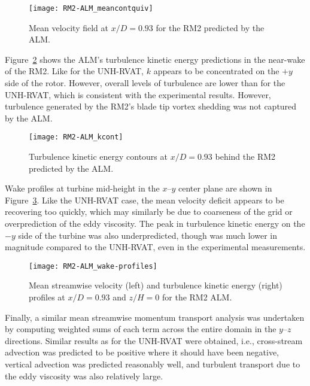 \begin{figure}
    \centering
    
    \texttt{[image: RM2-ALM\_meancontquiv]}
    
    \caption{Mean velocity field at $x/D=0.93$ for the RM2 predicted by the
        ALM.}
    
    \label{fig:RM2-ALM-meancontquiv}
\end{figure}

Figure~\ref{fig:RM2-ALM-kcont} shows the ALM's turbulence kinetic energy
predictions in the near-wake of the RM2. Like for the UNH-RVAT, $k$ appears to
be concentrated on the $+y$ side of the rotor. However, overall levels of
turbulence are lower than for the UNH-RVAT, which is consistent with the
experimental results. However, turbulence generated by the RM2's blade tip
vortex shedding was not captured by the ALM.

\begin{figure}
    \centering
    
    \texttt{[image: RM2-ALM\_kcont]}
    
    \caption{Turbulence kinetic energy contours at $x/D=0.93$ behind the RM2
        predicted by the ALM.}
    
    \label{fig:RM2-ALM-kcont}
\end{figure}

Wake profiles at turbine mid-height in the $x$--$y$ center plane are shown in
Figure~\ref{fig:RM2-ALM-profiles}. Like the UNH-RVAT case, the mean velocity
deficit appears to be recovering too quickly, which may similarly be due to
coarseness of the grid or overprediction of the eddy viscosity. The peak in
turbulence kinetic energy on the $-y$ side of the turbine was also
underpredicted, though was much lower in magnitude compared to the UNH-RVAT,
even in the experimental measurements.

\begin{figure}
    \centering
    
    \texttt{[image: RM2-ALM\_wake-profiles]}
    
    \caption{Mean streamwise velocity (left) and turbulence kinetic energy
        (right) profiles at $x/D=0.93$ and $z/H=0$ for the RM2 ALM.}
    
    \label{fig:RM2-ALM-profiles}
\end{figure}

Finally, a similar mean streamwise momentum transport analysis was undertaken by
computing weighted sums of each term across the entire domain in the $y$--$z$
directions. Similar results as for the UNH-RVAT were obtained, i.e.,
cross-stream advection was predicted to be positive where it should have been
negative, vertical advection was predicted reasonably well, and turbulent
transport due to the eddy viscosity was also relatively large.

